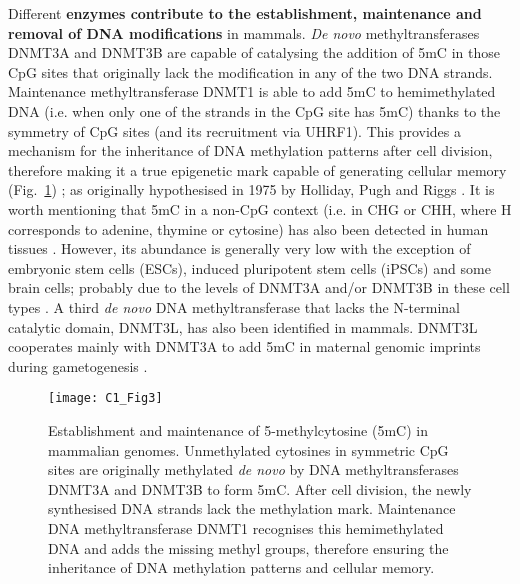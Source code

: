 \bigskip

Different \textbf{enzymes contribute to the establishment, maintenance and removal of DNA modifications} in mammals. \textit{De novo} methyltransferases DNMT3A and DNMT3B are capable of catalysing the addition of 5mC in those CpG sites that originally lack the modification in any of the two DNA strands. Maintenance methyltransferase DNMT1 is able to add 5mC to hemimethylated DNA (i.e. when only one of the strands in the CpG site has 5mC) thanks to the symmetry of CpG sites (and its recruitment via UHRF1). This provides a mechanism for the inheritance of DNA methylation patterns after cell division, therefore making it a true epigenetic mark capable of generating cellular memory (Fig.~\ref{fig:c1_fig3}) \cite{Li2014,Smith2013}; as originally hypothesised in 1975 by Holliday, Pugh and Riggs \cite{Holliday1975,Riggs1975}. It is worth mentioning that 5mC in a non-CpG context (i.e. in \acrshort{CHG} or \acrshort{CHH}, where H corresponds to adenine, thymine or cytosine) has also been detected in human tissues \cite{Schultz2015}. However, its abundance is generally very low with the exception of embryonic stem cells (\acrshort{ESCs}), induced pluripotent stem cells (\acrshort{iPSCs}) and some brain cells; probably due to the levels of DNMT3A and/or DNMT3B in these cell types \cite{Ziller2011,He2015}. A third \textit{de novo} DNA methyltransferase that lacks the N-terminal catalytic domain, DNMT3L, has also been identified in mammals. DNMT3L cooperates mainly with DNMT3A to add 5mC in maternal genomic imprints during gametogenesis \cite{Bourchis2001,Tomida2018}.

\begin{figure}[htbp!] 
	\centering    
	\texttt{[image: C1\_Fig3]}
	\vspace*{1 mm}
	\caption[Establishment and maintenance of 5-methylcytosine in mammalian genomes]{Establishment and maintenance of 5-methylcytosine (\acrshort{5mC}) in mammalian genomes. Unmethylated cytosines in symmetric CpG sites are originally methylated \textit{de novo} by DNA methyltransferases DNMT3A and DNMT3B to form \acrshort{5mC}. After cell division, the newly synthesised DNA strands lack the methylation mark. Maintenance DNA methyltransferase DNMT1 recognises this hemimethylated DNA and adds the missing methyl groups, therefore ensuring the inheritance of DNA methylation patterns and cellular memory.}
	\label{fig:c1_fig3}
\end{figure}

\bigskip

